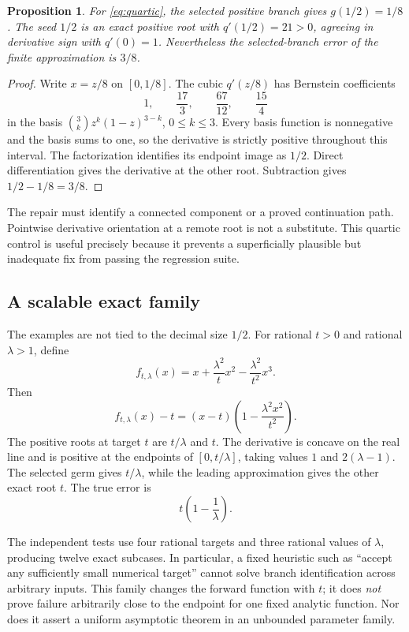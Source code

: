 \documentclass[11pt,letterpaper]{article}
\newtheorem{proposition}{Proposition}[section]
\begin{document}
\begin{proposition}
For \eqref{eq:quartic}, the selected positive branch gives $g(1/2)=1/8$. The seed $1/2$ is an exact positive root with $q'(1/2)=21>0$, agreeing in derivative sign with $q'(0)=1$. Nevertheless the selected-branch error of the finite approximation is $3/8$.
\end{proposition}
\begin{proof}
Write $x=z/8$ on $[0,1/8]$. The cubic $q'(z/8)$ has Bernstein coefficients
\[
 1,\qquad \frac{17}{3},\qquad \frac{67}{12},\qquad \frac{15}{4}
\]
in the basis $\binom3k z^k(1-z)^{3-k}$, $0\le k\le3$. Every basis function is nonnegative and the basis sums to one, so the derivative is strictly positive throughout this interval. The factorization identifies its endpoint image as $1/2$. Direct differentiation gives the derivative at the other root. Subtraction gives $1/2-1/8=3/8$.
\end{proof}

The repair must identify a connected component or a proved continuation path. Pointwise derivative orientation at a remote root is not a substitute. This quartic control is useful precisely because it prevents a superficially plausible but inadequate fix from passing the regression suite.

\subsection{A scalable exact family}

The examples are not tied to the decimal size $1/2$. For rational $t>0$ and rational $\lambda>1$, define
\begin{equation}
 f_{t,\lambda}(x)
 =x+\frac{\lambda^2}{t}x^2-\frac{\lambda^2}{t^2}x^3.
 \label{eq:family}
\end{equation}
Then
\[
 f_{t,\lambda}(x)-t
 =(x-t)\left(1-\frac{\lambda^2x^2}{t^2}\right).
\]
The positive roots at target $t$ are $t/\lambda$ and $t$. The derivative is concave on the real line and is positive at the endpoints of $[0,t/\lambda]$, taking values $1$ and $2(\lambda-1)$. The selected germ gives $t/\lambda$, while the leading approximation gives the other exact root $t$. The true error is
\[
 t\left(1-\frac1\lambda\right).
\]

The independent tests use four rational targets and three rational values of $\lambda$, producing twelve exact subcases. In particular, a fixed heuristic such as ``accept any sufficiently small numerical target'' cannot solve branch identification across arbitrary inputs. This family changes the forward function with $t$; it does \emph{not} prove failure arbitrarily close to the endpoint for one fixed analytic function. Nor does it assert a uniform asymptotic theorem in an unbounded parameter family.
\end{document}
